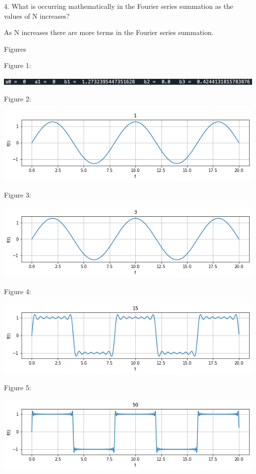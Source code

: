 \documentclass[nobib]{MSword}
\begin{document}
4. What is occurring mathematically in the Fourier series summation as the values of N increases?

As N increases there are more terms in the Fourier series summation.



\begin{center}
    Figures
\end{center}

Figure 1:

\includegraphics[scale = 0.75]
{txt/Lab8Fig1.png}

Figure 2:

\includegraphics[scale = 0.75]
{txt/Lab8Fig2.png}

Figure 3:

\includegraphics[scale = 0.75]
{txt/Lab8Fig3.png}

Figure 4:

\includegraphics[scale = 0.75]
{txt/Lab8Fig4.png}

Figure 5:

\includegraphics[scale = 0.75]
{txt/Lab8Fig5.png}
\end{document}
